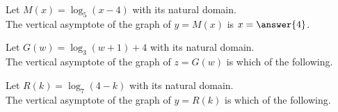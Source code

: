 \documentclass{ximera}
\author{Lee Wayand}
\begin{document}
\begin{exercise}







\begin{question}

Let $M(x) = \log_5(x-4)$ with its natural domain. \\

The vertical asymptote of the graph of $y = M(x)$ is $x = \answer{4}$.


\end{question}








\begin{question}

Let $G(w) = \log_3(w+1) + 4$ with its natural domain. \\

The vertical asymptote of the graph of $z = G(w)$ is which of the following.



\begin{multipleChoice}
\end{multipleChoice}


\end{question}









\begin{question}

Let $R(k) = \log_7(4-k)$ with its natural domain. \\

The vertical asymptote of the graph of $y = R(k)$ is which of the following.



\begin{multipleChoice}
\end{multipleChoice}


\end{question}












\end{exercise}
\end{document}
